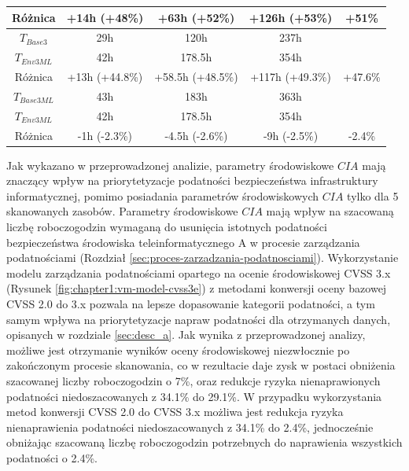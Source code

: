 \begin{table}[tbh]
\begin{center}
\begin{tabular}{c|ccc|c}
Różnica          &              +14h (+48\%) & +63h (+52\%) & +126h (+53\%) & +51\% \\  
\hline
$T_{Base3}$  &                             29h &            120h &    237h        &         \\
$T_{Env3ML}$     &                         42h &          178.5h &    354h        &         \\
Różnica          &               +13h (+44.8\%)  &  +58.5h (+48.5\%) & +117h (+49.3\%) & +47.6\% \\  
\hline
$T_{Base3ML}$    &                         43h &            183h &    363h         &         \\
$T_{Env3ML}$     &                         42h &          178.5h &    354h        &         \\
Różnica          &               -1h (-2.3\%)  &  -4.5h (-2.6\%) & -9h (-2.5\%) & -2.4\% \\  
\hline
\end{tabular}
\end{center}
\end{table}

\bigbreak
Jak wykazano w przeprowadzonej analizie, parametry środowiskowe $CIA$ mają znaczący wpływ na priorytetyzacje podatności bezpieczeństwa infrastruktury informatycznej, pomimo posiadania parametrów środowiskowych $CIA$ tylko dla 5 skanowanych zasobów. Parametry środowiskowe $CIA$ mają wpływ na szacowaną liczbę roboczogodzin wymaganą do usunięcia istotnych podatności bezpieczeństwa środowiska teleinformatycznego A w procesie zarządzania podatnościami (Rozdział \ref{sec:proces-zarzadzania-podatnosciami}). Wykorzystanie modelu zarządzania podatnościami opartego na ocenie środowiskowej CVSS 3.x (Rysunek \ref{fig:chapter1:vm-model-cvss3e}) z metodami konwersji oceny bazowej CVSS 2.0 do 3.x pozwala na lepsze dopasowanie kategorii podatności, a tym samym wpływa na priorytetyzacje napraw podatności dla otrzymanych danych, opisanych w rozdziale \ref{sec:desc_a}. Jak wynika z przeprowadzonej analizy, możliwe jest otrzymanie wyników oceny środowiskowej niezwłocznie po zakończonym procesie skanowania, co w rezultacie daje zysk w postaci obniżenia szacowanej liczby roboczogodzin o 7\%, oraz redukcje ryzyka nienaprawionych podatności niedoszacowanych z 34.1\% do 29.1\%. W przypadku wykorzystania metod konwersji CVSS 2.0 do CVSS 3.x możliwa jest redukcja ryzyka nienaprawienia podatności niedoszacowanych z 34.1\% do 2.4\%, jednocześnie obniżając szacowaną liczbę roboczogodzin potrzebnych do naprawienia wszystkich podatności o 2.4\%.

